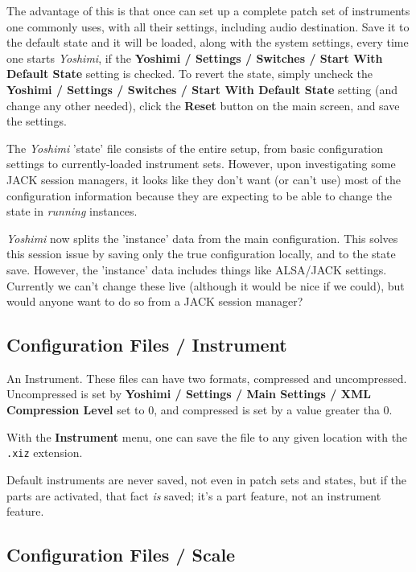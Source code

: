    The advantage of this is that once
   can set up a complete patch set of instruments one commonly uses, with
   all their settings, including audio destination.  Save it to the default
   state and it will be loaded, along with the system settings, every time one
   starts \textsl{Yoshimi}, if the
   \textbf{Yoshimi / Settings / Switches / Start With Default State}
   setting is checked.
   To revert the state, simply uncheck the
   \textbf{Yoshimi / Settings / Switches / Start With Default State}
   setting (and change any other needed), click the \textbf{Reset}
   button on the main screen, and save the settings.

   The \textsl{Yoshimi} 'state' file consists of the entire setup, from basic
   configuration settings to currently-loaded instrument sets.
   However, upon investigating some JACK
   session managers, it looks like they don't want (or can't use) most of the
   configuration information because they are expecting to be able to change
   the state in \textsl{running} instances.

   \textsl{Yoshimi} now splits the 'instance' data
   from the main configuration.  This solves this session issue
   by saving only the true configuration locally, and to the state save.
   However, the 'instance' data includes things like ALSA/JACK settings.
   Currently we can't change these live (although it would be nice if we could),
   but would anyone want to do so from a JACK session manager?

\subsection{Configuration Files / Instrument}
\label{subsec:configuration_instrument}

   An Instrument.  These files can have two formats, compressed and
   uncompressed.
   Uncompressed is set by
   \textbf{Yoshimi / Settings / Main Settings / XML Compression Level} set to
   0, and compressed is set by a value greater tha 0.

   With the \textbf{Instrument} menu, one can save the file to any
   given location with the \texttt{.xiz} extension.

   Default instruments are never saved, not even in patch sets and states, but
   if the parts are activated, that fact \textsl{is} saved; it's a part
   feature, not an instrument feature.

\subsection{Configuration Files / Scale}
\label{subsec:configuration_scale}

